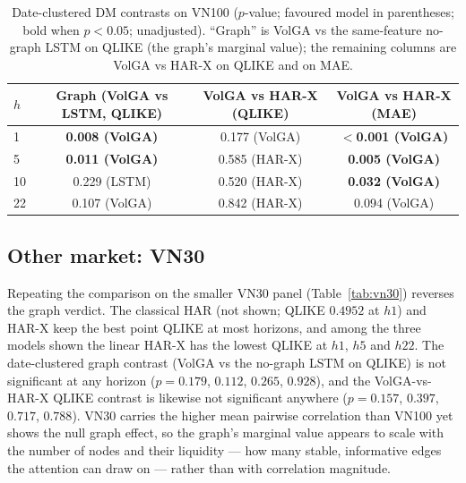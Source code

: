 \documentclass[runningheads]{llncs}
\begin{document}
\begin{table}[t]
\centering
\caption{Date-clustered DM contrasts on VN100 ($p$-value; favoured model in parentheses; bold when
$p<0.05$; unadjusted). ``Graph'' is VolGA vs the same-feature no-graph LSTM on QLIKE (the graph's
marginal value); the remaining columns are VolGA vs HAR-X on QLIKE and on MAE.}
\label{tab:dm-vn100}
\footnotesize
\setlength{\tabcolsep}{6pt}
\begin{tabular}{lccc}
\toprule
$h$ & Graph (VolGA vs LSTM, QLIKE) & VolGA vs HAR-X (QLIKE) & VolGA vs HAR-X (MAE) \\
\midrule
1  & \textbf{0.008 (VolGA)} & 0.177 (VolGA) & \textbf{$<$0.001 (VolGA)} \\
5  & \textbf{0.011 (VolGA)} & 0.585 (HAR-X) & \textbf{0.005 (VolGA)} \\
10 & 0.229 (LSTM)           & 0.520 (HAR-X) & \textbf{0.032 (VolGA)} \\
22 & 0.107 (VolGA)          & 0.842 (HAR-X) & 0.094 (VolGA) \\
\bottomrule
\end{tabular}
\end{table}

\subsection{Other market: VN30}\label{sec:vn30}
Repeating the comparison on the smaller VN30 panel (Table~\ref{tab:vn30}) reverses the graph verdict.
The classical HAR (not shown; QLIKE $0.4952$ at $h1$) and HAR-X keep the best point QLIKE at most
horizons, and among the three models shown the linear HAR-X has the lowest QLIKE at $h1$, $h5$ and
$h22$. The date-clustered graph contrast (VolGA vs the no-graph LSTM on QLIKE) is not significant at
any horizon ($p=0.179$, $0.112$, $0.265$, $0.928$), and the VolGA-vs-HAR-X QLIKE contrast is likewise
not significant anywhere ($p=0.157$, $0.397$, $0.717$, $0.788$). VN30 carries the higher mean
pairwise correlation than VN100 yet shows the null graph effect, so the graph's marginal value appears
to scale with the number of nodes and their liquidity --- how many stable, informative edges the
attention can draw on --- rather than with correlation magnitude.
\end{document}
